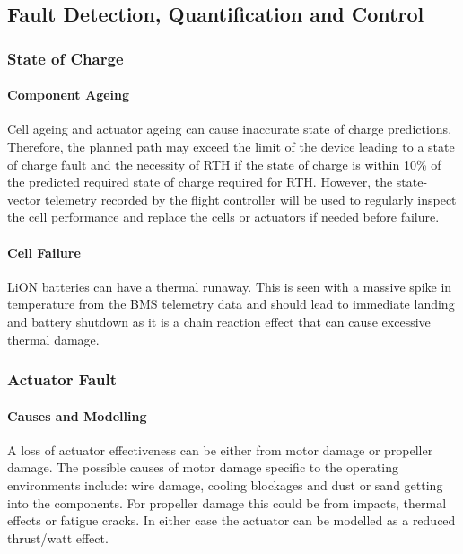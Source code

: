 \subsection{Fault Detection, Quantification and Control}

\subsubsection{State of Charge}
\paragraph{Component Ageing}
Cell ageing and actuator ageing can cause inaccurate state of charge predictions. Therefore, the planned path may exceed the limit of the device leading to a state of charge fault and the necessity of \gls{RTH} if the state of charge is within 10\% of the predicted required state of charge required for \gls{RTH}. However, the state-vector telemetry recorded by the flight controller will be used to regularly inspect the cell performance and replace the cells or actuators if needed before failure.
\paragraph{Cell Failure}
\gls{LiON} batteries can have a thermal runaway. This is seen with a massive spike in temperature from the \gls{BMS} telemetry data and should lead to immediate landing and battery shutdown as it is a chain reaction effect that can cause excessive thermal damage\cite{LiONRunaway}.

\subsubsection{Actuator Fault}
\paragraph{Causes and Modelling}
A loss of actuator effectiveness can be either from motor damage or propeller damage. The possible causes of motor damage specific to the operating environments include: wire damage, cooling blockages and dust or sand getting into the components. For propeller damage this could be from impacts, thermal effects or fatigue cracks. In either case the actuator can be modelled as a reduced thrust/watt effect.
